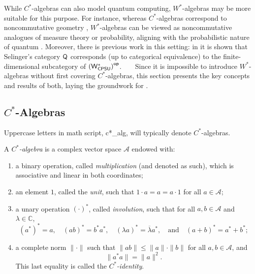  While $C^*$-algebras can also model quantum computing, $W^*$-algebras may be more suitable for this purpose. For instance, whereas $C^*$-algebras correspond to noncommutative geometry \cite{connesNoncommutativeGeometry1995}, $W^*$-algebras can be viewed as noncommutative analogues of measure theory or probability, aligning with the probabilistic nature of quantum \cite{hamhalterQuantumMeasureTheory2003,HansQuantumProbabilityQuantumInformationTheory10}. Moreover, there is previous work in this setting: in \cite{choSemanticsQuantumProgramming2016} it is shown that Selinger’s category $\mathsf{Q}$ corresponds (up to categorical equivalence) to the finite-dimensional subcategory of $\left(\mathsf{W^*_{CPSU}}\right)^{\mathsf{op}}$.
  
  
Since it is impossible to introduce \( W^* \)-algebras without first covering \( C^* \)-algebras, this section presents the key concepts and results of both, laying the groundwork for .

\subsection{\( C^* \)-Algebras}

Uppercase letters in math script, \gls{c*_alg}, will typically denote $C^*$-algebras.


\begin{definition}
  A \emph{\( C^* \)-algebra} is a complex vector space \( \mathscr{A} \) endowed with:
\begin{enumerate}
    \item a binary operation, called \emph{multiplication} (and denoted as such), which is associative and linear in both coordinates;
    \item an element \( 1 \), called the \emph{unit}, such that \( 1 \cdot a = a = a \cdot 1 \) for all \( a \in \mathscr{A} \);
    \item a unary operation \( (\cdot)^* \), called \emph{involution}, such that for all \( a, b \in \mathscr{A} \) and \( \lambda \in \mathbb{C} \),
    \[
    (a^*)^* = a, \quad (ab)^* = b^* a^*, \quad (\lambda a)^* = \overline{\lambda} a^*, \quad \text{and} \quad (a + b)^* = a^* + b^*;
    \]
    \item a complete norm \( \|\cdot\| \) such that \( \| ab \| \leq \|a\| \cdot \|b\| \) for all \( a, b \in \mathscr{A} \), and
    \[
    \|a^* a\| = \|a\|^2.
    \]
    This last equality is called the \emph{\( C^* \)-identity}.
\end{enumerate}
\end{definition}

